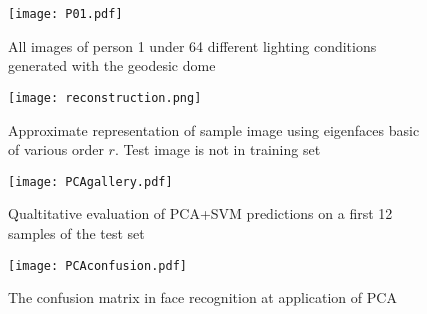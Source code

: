 \begin{figure}[h]
  \centering
  \texttt{[image: P01.pdf]}
  \caption{All images of person 1 under 64 different lighting conditions generated with the geodesic dome}
  \label{P01}
\end{figure}

\begin{figure}[htbp]
  \centering
  \texttt{[image: reconstruction.png]}
  \caption{Approximate representation of sample image using eigenfaces basic of various order $r$. Test image is not in training set}
  \label{appendix:reconstruction}
\end{figure}

\begin{figure}[htbp]
  \centering
  \texttt{[image: PCAgallery.pdf]}
  \caption{Qualtitative evaluation of PCA+SVM predictions on a first 12 samples of the test set}
  \label{appendix:PCAgallery}
\end{figure}

\begin{figure}[htbp]
  \centering
  \texttt{[image: PCAconfusion.pdf]}
  \caption{The confusion matrix in face recognition at application of PCA}
  \label{appendix:PCAconfusion}
\end{figure}
